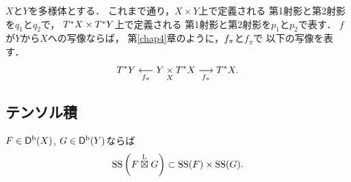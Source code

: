 \(X\)と\(Y\)を多様体とする．
これまで通り，\(X\times Y\)上で定義される
第1射影と第2射影を\(q_1\)と\(q_2\)で，
\(\cotb[X]\times \cotb[Y]\)上で定義される
第1射影と第2射影を\(p_1\)と\(p_2\)で表す．
\(f\)が\(Y\)から\(X\)への写像ならば，
第\ref{chap4}章のように，\(\mpb[f]\)と\(f_\pi\)で
以下の写像を表す．
\[
    \cotb[Y]
    \underset{\mpb[f]}{\longleftarrow}
    Y\pb[X]\cotb[X]
    \underset{f_{\pi}}{\longrightarrow}
    \cotb[X].
\]





\subsection*{テンソル積}


\begin{leftbar}
\begin{PRP}
    \(F\in\Dompb(X)\), \(G\in\Dompb(Y)\)ならば
    \[
        \muS\left(F\lletens[] G\right)
        \subset 
        \muS(F)\times\muS(G).
    \]
\end{PRP}        
\end{leftbar}

